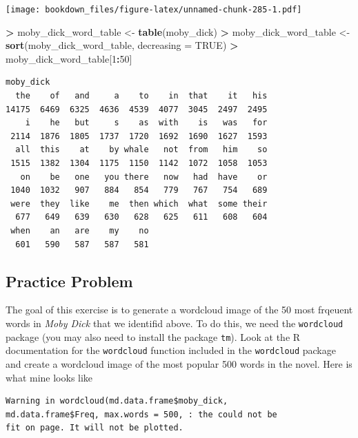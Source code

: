 \documentclass[]{krantz}
\makeatletter
\newenvironment{Shaded}{\begin{snugshade}}{\end{snugshade}}
\newcommand{\KeywordTok}[1]{\textcolor[rgb]{0.27,0.27,0.27}{\textbf{#1}}}
\newcommand{\DataTypeTok}[1]{\textcolor[rgb]{0.27,0.27,0.27}{#1}}
\newcommand{\DecValTok}[1]{\textcolor[rgb]{0.06,0.06,0.06}{#1}}
\newcommand{\StringTok}[1]{\textcolor[rgb]{0.5,0.5,0.5}{#1}}
\newcommand{\OtherTok}[1]{\textcolor[rgb]{0.37,0.37,0.37}{#1}}
\newcommand{\OperatorTok}[1]{\textcolor[rgb]{0.43,0.43,0.43}{\textbf{#1}}}
\newcommand{\NormalTok}[1]{#1}
\newenvironment{kframe}{%
\medskip{}
\setlength{\fboxsep}{.8em}
 \def\at@end@of@kframe{}%
 \ifinner\ifhmode%
  \def\at@end@of@kframe{\end{minipage}}%
  \begin{minipage}{\columnwidth}%
 \fi\fi%
 \def\FrameCommand##1{\hskip\@totalleftmargin \hskip-\fboxsep
 \colorbox{shadecolor}{##1}\hskip-\fboxsep
     \hskip-\linewidth \hskip-\@totalleftmargin \hskip\columnwidth}%
 \MakeFramed {\advance\hsize-\width
   \@totalleftmargin\z@ \linewidth\hsize
   \@setminipage}}%
 {\par\unskip\endMakeFramed%
 \at@end@of@kframe}
\renewenvironment{Shaded}{\begin{kframe}}{\end{kframe}}
\makeatother
\begin{document}
\texttt{[image: bookdown\_files/figure-latex/unnamed-chunk-285-1.pdf]}

\begin{Shaded}
\begin{Highlighting}[]
\OperatorTok{>}\StringTok{ }\NormalTok{moby_dick_word_table <-}\StringTok{ }\KeywordTok{table}\NormalTok{(moby_dick)}
\OperatorTok{>}\StringTok{ }\NormalTok{moby_dick_word_table <-}\StringTok{ }\KeywordTok{sort}\NormalTok{(moby_dick_word_table, }\DataTypeTok{decreasing =} \OtherTok{TRUE}\NormalTok{)}
\OperatorTok{>}\StringTok{ }\NormalTok{moby_dick_word_table[}\DecValTok{1}\OperatorTok{:}\DecValTok{50}\NormalTok{]}
\end{Highlighting}
\end{Shaded}

\begin{verbatim}
moby_dick
  the    of   and     a    to    in  that    it   his 
14175  6469  6325  4636  4539  4077  3045  2497  2495 
    i    he   but     s    as  with    is   was   for 
 2114  1876  1805  1737  1720  1692  1690  1627  1593 
  all  this    at    by whale   not  from   him    so 
 1515  1382  1304  1175  1150  1142  1072  1058  1053 
   on    be   one   you there   now   had  have    or 
 1040  1032   907   884   854   779   767   754   689 
 were  they  like    me  then which  what  some their 
  677   649   639   630   628   625   611   608   604 
 when    an   are    my    no 
  601   590   587   587   581 
\end{verbatim}

\subsection{Practice Problem}\label{practice-problem-15}

The goal of this exercise is to generate a wordcloud image of the 50
most frqeuent words in \emph{Moby Dick} that we identifid above. To do
this, we need the \texttt{wordcloud} package (you may also need to
install the package \texttt{tm}). Look at the R documentation for the
\texttt{wordcloud} function included in the \texttt{wordcloud} package
and create a wordcloud image of the most popular 500 words in the novel.
Here is what mine looks like

\begin{verbatim}
Warning in wordcloud(md.data.frame$moby_dick,
md.data.frame$Freq, max.words = 500, : the could not be
fit on page. It will not be plotted.
\end{verbatim}
\end{document}

